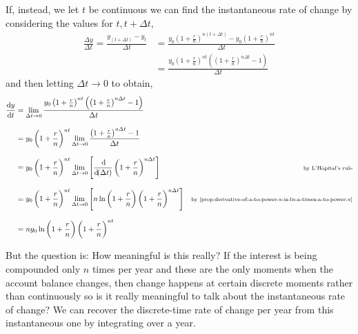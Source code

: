 \documentclass[MathsNotesBase.tex]{subfiles}
\begin{document}
{\begin{exe}
{				If, instead, we let $t$ be continuous we can find the instantaneous rate of change by considering the values for ${ t, t + \Delta t }$,
				\begin{align*}
				\frac{\Delta y}{\Delta t} = \frac{y_{(t + \Delta t)} - y_t}{\Delta t} &=  \frac{y_0 \left(1 + \frac{r}{n}\right)^{n(t + \Delta t)} - y_0 \left(1 + \frac{r}{n}\right)^{nt}}{\Delta t} \\[8pt]
				&= \frac{y_0\left(1 + \frac{r}{n}\right)^{nt}\left(\left(1 + \frac{r}{n}\right)^{n\Delta t} - 1\right)}{\Delta t}
				\end{align*}
				and then letting ${ \Delta t \to 0 }$ to obtain,
				\begin{align*}
				\frac{\dif y}{\dif t} &= \lim_{\Delta t \to 0} \frac{y_0\left(1 + \frac{r}{n}\right)^{nt}\left(\left(1 + \frac{r}{n}\right)^{n\Delta t} - 1\right)}{\Delta t} \\[8pt]
				&= y_0\left(1 + \frac{r}{n}\right)^{nt} \lim_{\Delta t \to 0} \frac{\left(1 + \frac{r}{n}\right)^{n\Delta t} - 1}{\Delta t} &\sidecomment{} \\[8pt]
				&= y_0\left(1 + \frac{r}{n}\right)^{nt} \lim_{\Delta t \to 0} \left[\frac{\dif}{\dif (\Delta t)} \left(1 + \frac{r}{n}\right)^{n\Delta t}\right] &\sidecomment{by L'H\^{o}pital's rule} \\[8pt]
				&= y_0\left(1 + \frac{r}{n}\right)^{nt} \lim_{\Delta t \to 0} \left[n\ln{\left(1 + \frac{r}{n}\right)}\left(1 + \frac{r}{n}\right)^{n\Delta t}\right] &\sidecomment{by \autoref{prop:derivative-of-a-to-power-x-is-ln-a-times-a-to-power-x}} \\[8pt]
				&= ny_0 \ln{\left(1 + \frac{r}{n}\right)} \left(1 + \frac{r}{n}\right)^{nt}
				\end{align*}

				But the question is: How meaningful is this really? If the interest is being compounded only $n$ times per year and these are the only moments when the account balance changes, then change happens at certain discrete moments rather than continuously so is it really meaningful to talk about the instantaneous rate of change? We can recover the discrete-time rate of change per year from this instantaneous one by integrating over a year.\\
				
}
\end{exe}}
\end{document}
